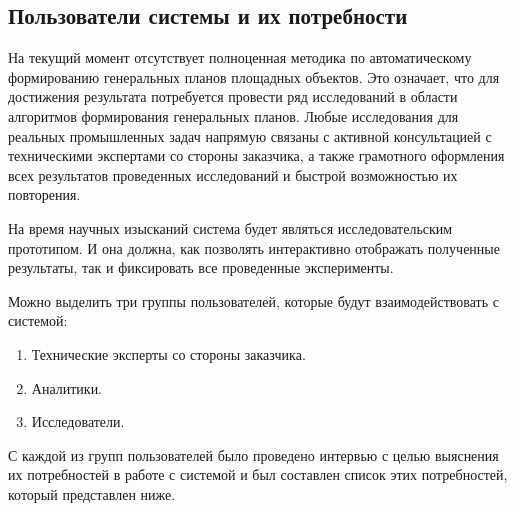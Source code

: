 \subsection*{\large{Пользователи системы и их потребности}}

На текущий момент отсутствует полноценная методика
по автоматическому формированию генеральных планов площадных объектов.
Это означает, что для достижения результата потребуется провести ряд исследований в области алгоритмов
формирования генеральных планов.
Любые исследования для реальных промышленных задач напрямую связаны с активной консультацией с техническими
экспертами со стороны заказчика, а также грамотного оформления всех результатов проведенных исследований
и быстрой возможностью их повторения.

На время научных изысканий система будет являться исследовательским прототипом.
И она должна, как позволять интерактивно отображать полученные результаты,
так и фиксировать все проведенные эксперименты.


Можно выделить три группы пользователей, которые будут взаимодействовать с системой:
\begin{enumerate}
    \item Технические эксперты со стороны заказчика.
    \item Аналитики.
    \item Исследователи.
\end{enumerate}

С каждой из групп пользователей было проведено интервью с целью выяснения их потребностей в работе с системой
и был составлен список этих потребностей, который представлен ниже.

